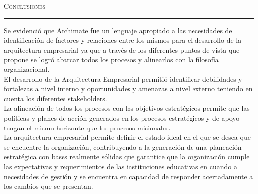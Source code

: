 \thispagestyle{empty}
\vspace*{3cm}
\noindent\Huge\textsc{Conclusiones}\\
\normalsize
\noindent\rule[2pt]{\textwidth}{0.8pt}
\hspace*{3cm}

Se evidenció que Archimate fue un lenguaje apropiado a las necesidades de identificación de factores y relaciones entre los mismos para el desarrollo de la arquitectura empresarial ya que a través de los diferentes puntos de vista que propone se logró abarcar todos los procesos y alinearlos con la filosofía organizacional. \\

El desarrollo de la Arquitectura Empresarial permitió identificar debilidades y fortalezas a nivel interno y oportunidades y amenazas a nivel externo teniendo en cuenta los diferentes stakeholders. \\

La alineación de todos los procesos con los objetivos estratégicos permite que las políticas y planes de acción generados en los procesos estratégicos y de apoyo tengan el mismo horizonte que los procesos misionales. \\

La arquitectura empresarial permite definir el estado ideal en el que se desea que se encuentre la organización, contribuyendo a la generación de una planeación estratégica con bases realmente sólidas que garantice que la organización cumple las expectativas y requerimientos de las instituciones educativas en cuando a necesidades de gestión y se encuentra en capacidad de responder acertadamente a los cambios que se presentan.